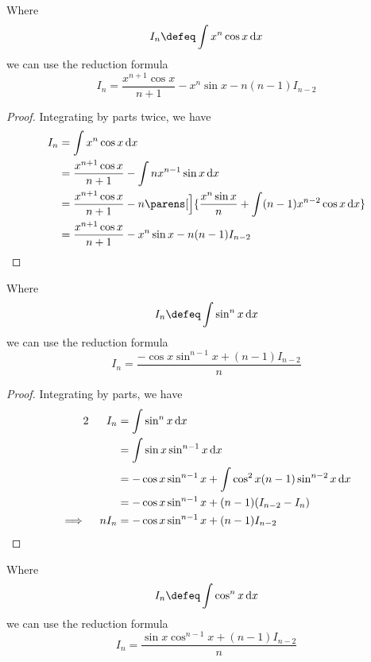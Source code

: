 \begin{theorem}
 Where
 \begin{equation*}
  I_n \defeq \integ{x^n \cos x}{x}
 \end{equation*}
 we can use the reduction formula
 \begin{equation*}
  I_n = \frac{x^{n + 1} \cos x}{n + 1} - x^n \sin x - n(n - 1)I_{n - 2}
 \end{equation*}
\end{theorem}
\begin{proof}
 Integrating by parts twice, we have
 \begin{align*}
  I_n &= \integ{x^n \cos x}{x} \\
      &= \frac{x^{n + 1} \cos x}{n + 1} - \integ{n x^{n - 1} \sin x}{x} \\
      &= \frac{x^{n + 1} \cos x}{n + 1} - n\parens[\Big]{
       \frac{x^n \sin x}{n} + \integ{(n - 1)x^{n - 2} \cos x}{x}} \\
      &= \frac{x^{n + 1} \cos x}{n + 1} - x^n \sin x - n(n - 1)I_{n - 2}
       \qedhere
 \end{align*}
\end{proof}
\begin{theorem}
 Where
 \begin{equation*}
  I_n \defeq \integ{\sin^n x}{x}
 \end{equation*}
 we can use the reduction formula
 \begin{equation*}
  I_n = \frac{-\cos x \sin^{n - 1} x + (n - 1) I_{n - 2}} n
 \end{equation*}
\end{theorem}
\begin{proof}
 Integrating by parts, we have
 \begin{alignat*}2
  && I_n &= \integ{\sin^n x}{x} \\
  &&     &= \integ{\sin x \sin^{n - 1}x}{x} \\
  &&     &= -\cos x \sin^{n - 1} x +
             \integ{\cos^2 x (n - 1) \sin^{n - 2} x}{x} \\
  &&     &= -\cos x \sin^{n - 1} x + (n - 1)(I_{n - 2} - I_n) \\
  \implies{}&& n I_n &= -\cos x \sin^{n - 1} x + (n - 1)I_{n - 2} \qedhere
 \end{alignat*}
\end{proof}
\begin{theorem}
 Where
 \begin{equation*}
  I_n \defeq \integ{\cos^n x}{x}
 \end{equation*}
 we can use the reduction formula
 \begin{equation*}
  I_n = \frac{\sin x \cos^{n - 1} x + (n - 1) I_{n - 2}} n
 \end{equation*}
\end{theorem}
